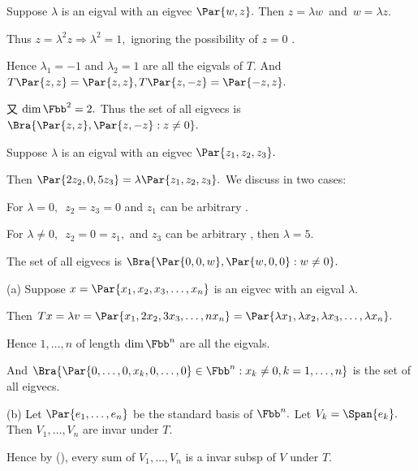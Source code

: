 Suppose $\lambda$ is an eigval with an eigvec $\Par{w,z}.$ Then $z=\lambda w$ \,{\small and}\, $ w=\lambda z.$\par
\Blind{\Solution} Thus $z=\lambda^2 z\Rightarrow \lambda^2=1,$ ignoring the possibility of $z=0$ .\par
\Blind{\Solution} Hence $\lambda_1=-1$ and $\lambda_2=1$ are all the eigvals of $T.$ And $T\Par{z,z}=\Par{z,z},T\Par{z,-z}=\Par{-z,z}.$\par
\Blind{\Solution} 又 $\dim\Fbb^2=2.$ Thus the set of all eigvecs is $\Bra{\Par{z,z},\Par{z,-z}:z\neq 0}.$\PfEnd
\SepLine

Suppose $\lambda$ is an eigval with an eigvec $\Par{z_1,z_2,z_3}.$\par
\Blind{\Solution} Then $\Par{2z_2, 0,5z_3}=\lambda\Par{z_1,z_2,z_3}.$ We discuss in two cases:\par
\Blind{\Solution} For $\lambda=0,$\, $z_2=z_3=0$ and $z_1$ can be arbitrary .\par
\Blind{\Solution} For $\lambda\neq 0,$\, $z_2=0=z_1,$ and $z_3$ can be arbitrary , then $\lambda=5$.\par
\Blind{\Solution} The set of all eigvecs is $\Bra{\Par{0,0,w},\Par{w,0,0}:w\neq 0}.$\PfEnd
\SepLine

\par\quad
(a) Suppose $x=\Par{x_1,x_2,x_3,\dots,x_n}$ is an eigvec with an eigval $\lambda.$\par\quad\Ha
Then $Tx=\lambda v=\Par{x_1,2 x_2,3 x_3,\dots,n x_n}=\Par{\lambda x_1,\lambda x_2,\lambda x_3,\dots,\lambda x_n}.$\par\quad\Ha
Hence $1,\dots,n$ of length $\dim\Fbb^n$ are all the eigvals.\par\quad\Ha
And $\Bra{\Par{0,\dots,0,x_k,0,\dots,0}\in\Fbb^n:x_k\neq 0,k=1,\dots,n}$ is the set of all eigvecs.\par\quad
(b) Let $\Par{e_1,\dots,e_n}$ be the standard basis of $\Fbb^n.$ Let $V_k=\Span{e_k}.$ Then $V_1,\dots,V_n$ are invar under $T.$\par\quad\Hb
Hence by (), every sum of $V_1,\dots,V_n$ is a invar subsp of $V$ under $T.$\PfEnd
\SepLine

